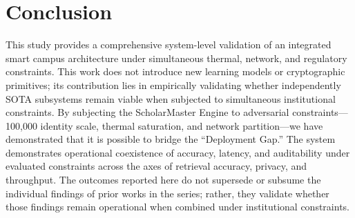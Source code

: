 \documentclass[conference]{IEEEtran}
\begin{document}
\section{Conclusion}
This study provides a comprehensive system-level validation of an integrated smart campus architecture under simultaneous thermal, network, and regulatory constraints. This work does not introduce new learning models or cryptographic primitives; its contribution lies in empirically validating whether independently SOTA subsystems remain viable when subjected to simultaneous institutional constraints. By subjecting the ScholarMaster Engine to adversarial constraints---100,000 identity scale, thermal saturation, and network partition---we have demonstrated that it is possible to bridge the ``Deployment Gap.'' The system demonstrates operational coexistence of accuracy, latency, and auditability under evaluated constraints across the axes of retrieval accuracy, privacy, and throughput. The outcomes reported here do not supersede or subsume the individual findings of prior works in the series; rather, they validate whether those findings remain operational when combined under institutional constraints.
\end{document}
